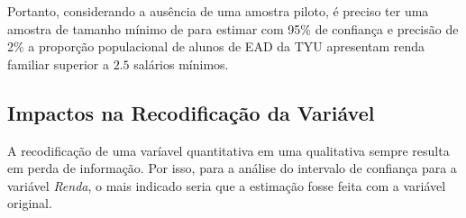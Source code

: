 	Portanto, considerando a ausência de uma amostra piloto, é preciso ter uma
	amostra de tamanho mínimo de \SEISCnceil para estimar com 95\% de
	confiança e precisão de 2\% a proporção populacional de alunos de EAD da TYU
	apresentam renda familiar superior a $\num{2,5}$ salários mínimos.

\subsection{Impactos na Recodificação da Variável}
	
	A recodificação de uma varíavel quantitativa em uma qualitativa sempre
	resulta em perda de informação. Por isso, para a análise do intervalo de
	confiança para a variável \textit{Renda}, o mais indicado seria que a
	estimação fosse feita com a variável original.
